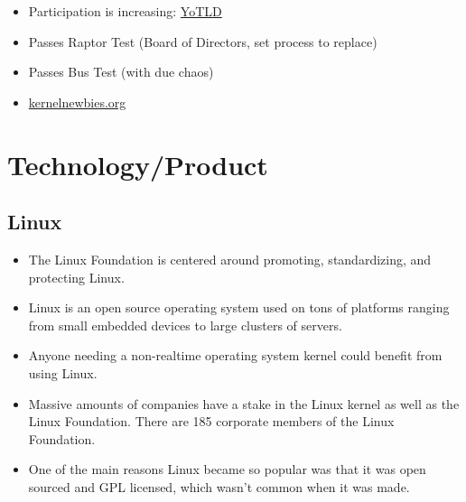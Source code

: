 \begin{itemize}
\itemsep1pt\parskip0pt
\item
  Participation is increasing:
  \href{http://www.zdnet.com/article/linus-torvalds-still-wants-the-linux-desktop/}{YoTLD}
\item
  Passes Raptor Test (Board of Directors, set process to replace)
\item
  Passes Bus Test (with due chaos)
\item
  \href{http://kernelnewbies.org/}{kernelnewbies.org}
\end{itemize}

\section{Technology/Product}\label{technologyproduct}

\subsection{Linux}\label{linux}

\begin{itemize}
\itemsep1pt\parskip0pt
\item
  The Linux Foundation is centered around promoting, standardizing, and
  protecting Linux.
\item
  Linux is an open source operating system used on tons of platforms
  ranging from small embedded devices to large clusters of servers.
\item
  Anyone needing a non-realtime operating system kernel could benefit
  from using Linux.
\item
  Massive amounts of companies have a stake in the Linux kernel as well
  as the Linux Foundation. There are 185 corporate members of the Linux
  Foundation.
\item
  One of the main reasons Linux became so popular was that it was open
  sourced and GPL licensed, which wasn't common when it was made.
\end{itemize}
